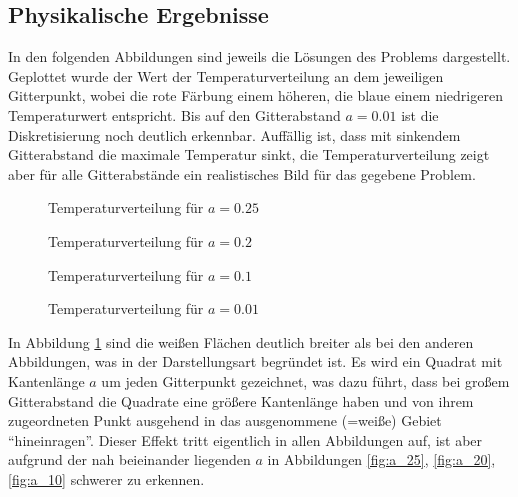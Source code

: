 \documentclass[10pt,a4paper]{article}
\begin{document}
\subsection{Physikalische Ergebnisse}
In den folgenden Abbildungen sind jeweils die Lösungen des Problems dargestellt. Geplottet wurde der Wert der Temperaturverteilung an dem jeweiligen Gitterpunkt, wobei die rote Färbung einem höheren, die blaue einem niedrigeren Temperaturwert entspricht. Bis auf den Gitterabstand $a=\num{0,01}$ ist die Diskretisierung noch deutlich erkennbar.
Auffällig ist, dass mit sinkendem Gitterabstand die maximale Temperatur sinkt, die Temperaturverteilung zeigt aber für alle Gitterabstände ein realistisches Bild für das gegebene Problem.
\begin{figure}[htbp!]
\begin{minipage}[c]{0.5\linewidth}
\centering
\vspace{-40pt}
\scalebox{0.85}{}
\vspace{-40pt}
\caption{Temperaturverteilung für $a=\num{0,25}$}
\label{fig:a_25}
\end{minipage}
\begin{minipage}[c]{0.5\linewidth}
\centering
\vspace{-40pt}
\scalebox{0.85}{}
\vspace{-40pt}
\caption{Temperaturverteilung für $a=\num{0,2}$}
\label{fig:a_20}
\end{minipage}
\begin{minipage}[c]{0.5\linewidth}
\centering
\vspace{-40pt}
\scalebox{0.85}{}
\vspace{-40pt}
\caption{Temperaturverteilung für $a=\num{0,1}$}
\label{fig:a_10}
\end{minipage}
\begin{minipage}[c]{0.5\linewidth}
\centering
\vspace{-40pt}
\scalebox{0.85}{}
\vspace{-40pt}
\caption{Temperaturverteilung für $a=\num{0,01}$}
\label{fig:a_1}
\end{minipage}
\end{figure}
In Abbildung \ref{fig:a_1} sind die weißen Flächen deutlich breiter als bei den anderen Abbildungen, was in der Darstellungsart begründet ist. Es wird ein Quadrat mit Kantenlänge $a$ um jeden Gitterpunkt gezeichnet, was dazu führt, dass bei großem Gitterabstand die Quadrate eine größere Kantenlänge haben und von ihrem zugeordneten Punkt ausgehend in das ausgenommene (=weiße) Gebiet "`hineinragen"'. Dieser Effekt tritt eigentlich in allen Abbildungen auf, ist aber aufgrund der nah beieinander liegenden $a$ in Abbildungen \ref{fig:a_25}, \ref{fig:a_20}, \ref{fig:a_10} schwerer zu erkennen.
\end{document}
